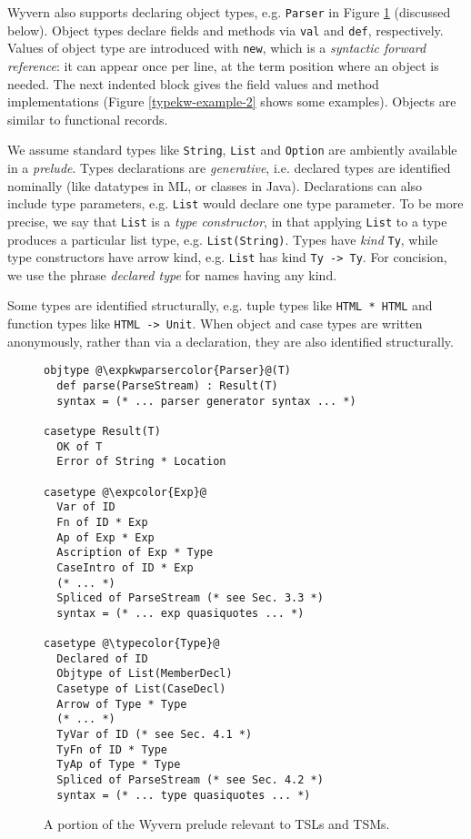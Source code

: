 \documentclass{sig-alternate}[10pt]
\newcommand{\expkwparsercolor}[1]{\textcolor[HTML]{336699}{#1}}
\newcommand{\expcolor}[1]{\textcolor[HTML]{FF0033}{#1}}
\newcommand{\typecolor}[1]{\textcolor[HTML]{660066}{#1}}
\newcommand{\mycaption}[1]{\vspace{-10px}\caption{#1}\vspace{-8px}}
\newcommand{\lstinlinew}[1]{\lstinline[style=wyvern]{#1}}
\begin{document}
Wyvern also supports declaring object types, e.g. \lstinlinew{Parser} in Figure \ref{exp-prelude} (discussed below). Object types declare fields and methods via \texttt{val} and \texttt{def}, respectively. Values of object type are introduced with \lstinlinew{new}, which  is a  \emph{syntactic forward reference}: it can appear once per line, at the term position where an object is needed. The next indented block gives the field values and method implementations (Figure \ref{typekw-example-2} shows some examples). Objects are similar to functional records. %

We assume standard types like \lstinlinew{String}, \lstinlinew{List} and \lstinlinew{Option} are ambiently available in a \emph{prelude}. Types declarations are \emph{generative}, i.e. declared types are identified nominally (like datatypes in ML, or classes in Java). Declarations can also include type parameters, e.g. \lstinlinew{List} would declare one type parameter. To be more precise, we say that \lstinlinew{List} is a \emph{type constructor}, in that applying \lstinlinew{List} to a type produces a particular list type, e.g. \lstinlinew{List(String)}. Types have \emph{kind} \lstinlinew{Ty}, while {type constructors} have arrow kind, e.g. \lstinlinew{List} has kind \lstinlinew{Ty -> Ty}. For concision, we use the phrase \emph{declared type} for names having any kind. 


Some types are identified structurally, e.g. tuple types like \lstinlinew{HTML * HTML} and function types like \lstinlinew{HTML -> Unit}. When object and case types are written anonymously, rather than via a declaration, they are also identified structurally. %

\begin{figure}[t!]
\begin{lstlisting}[style=wyvern]
objtype @\expkwparsercolor{Parser}@(T)
  def parse(ParseStream) : Result(T)
  syntax = (* ... parser generator syntax ... *)

casetype Result(T)
  OK of T
  Error of String * Location

casetype @\expcolor{Exp}@
  Var of ID
  Fn of ID * Exp
  Ap of Exp * Exp
  Ascription of Exp * Type
  CaseIntro of ID * Exp
  (* ... *)
  Spliced of ParseStream (* see Sec. 3.3 *)
  syntax = (* ... exp quasiquotes ... *)

casetype @\typecolor{Type}@
  Declared of ID
  Objtype of List(MemberDecl)
  Casetype of List(CaseDecl)
  Arrow of Type * Type
  (* ... *)
  TyVar of ID (* see Sec. 4.1 *)
  TyFn of ID * Type
  TyAp of Type * Type
  Spliced of ParseStream (* see Sec. 4.2 *)
  syntax = (* ... type quasiquotes ... *)
\end{lstlisting}
\mycaption{A portion of the Wyvern prelude relevant to TSLs and TSMs.}
\label{exp-prelude}
\end{figure}
\end{document}
